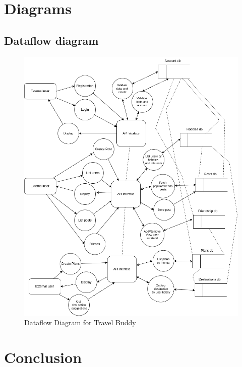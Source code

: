 \documentclass[12pt,a4paper]{report}
\begin{document}
\chapter{Diagrams}

\section{Dataflow diagram}
\begin{figure}
    \centering
    \includegraphics[width=\textwidth, keepaspectratio]{figures/dataflow.png}
    \caption{Dataflow Diagram for Travel Buddy}
    \label{fig:dataflow}
\end{figure}




\chapter{Conclusion}

\raggedright
	
\end{document}
